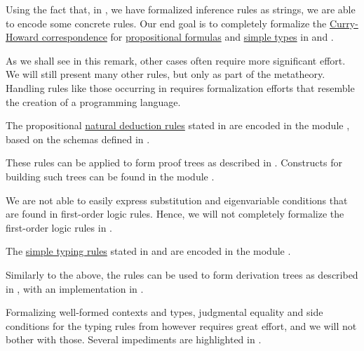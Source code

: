 \begin{remark}\label{rem:inference_rule_formalization}
  Using the fact that, in , we have formalized inference rules as strings, we are able to encode some concrete rules. Our end goal is to completely formalize the \hyperref[con:curry_howard_correspondence]{Curry-Howard correspondence} for \hyperref[def:propositional_syntax/formula]{propositional formulas} and \hyperref[def:simple_type]{simple types} in  and .

  As we shall see in this remark, other cases often require more significant effort. We will still present many other rules, but only as part of the metatheory. Handling rules like those occurring in  requires formalization efforts that resemble the creation of a programming language.

  \begin{itemize}
     The propositional \hyperref[def:natural_deduction_rule]{natural deduction rules} stated in  are encoded in the module , based on the schemas defined in .

    These rules can be applied to form proof trees as described in . Constructs for building such trees can be found in the module .

    We are not able to easily express substitution and eigenvariable conditions that are found in first-order logic rules. Hence, we will not completely formalize the first-order logic rules in .

     The \hyperref[def:simple_typing_rule]{simple typing rules} stated in  and  are encoded in the module .

    Similarly to the above, the rules can be used to form derivation trees as described in , with an implementation in .

    Formalizing well-formed contexts and types, judgmental equality and side conditions for the typing rules from  however requires great effort, and we will not bother with those. Several impediments are highlighted in .
  \end{itemize}
\end{remark}

